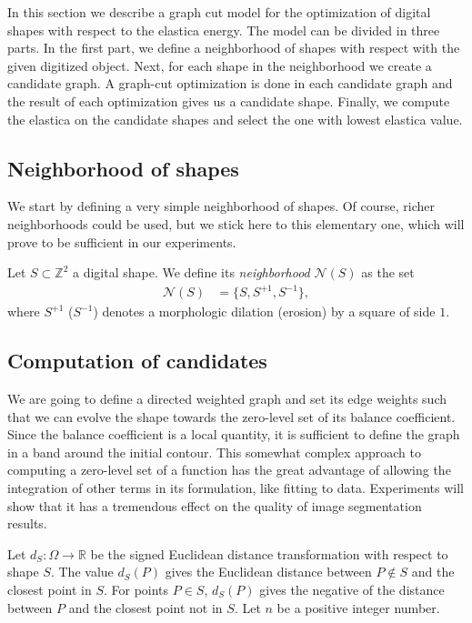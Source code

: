 \documentclass[review]{siamart220329}
\begin{document}
In this section we describe a graph cut model for the optimization of digital shapes with respect to the elastica energy. The model can be divided in three
parts. In the first part, we define a neighborhood of shapes with respect with the given digitized object. Next, for each shape in the neighborhood 
we create a candidate graph. A graph-cut optimization is done in each candidate graph and the result of each optimization gives us a candidate shape. Finally, we compute the elastica on the candidate shapes and select the one with lowest elastica value.
%
%
\subsection{Neighborhood of shapes}
%
%
We start by defining a very simple neighborhood of shapes. Of course, richer neighborhoods could be used, but we
stick here to this elementary one, which will prove to be sufficient in our experiments.
%
%
\begin{definition}
	Let $S \subset \mathbb{Z}^2$ a digital shape. We define its {\em neighborhood}  $\mathcal{N}(S)$ as the set
	\begin{align*}
		\mathcal{N}(S) &= \Big\{S, S^{+1},S^{-1} \big\},
	\end{align*}
	where $S^{+1}$ ($S^{-1}$) denotes a morphologic dilation (erosion) by a square of side $1$.
\end{definition}
%
%
\subsection{Computation of candidates}\label{sec:graph-cut-model}

We are going to define a directed weighted graph and set its edge weights
such that we can evolve the shape towards the zero-level set of
its balance coefficient. Since the balance
coefficient is a local quantity, it is sufficient to define the graph
in a band around the initial contour. This somewhat
  complex approach to computing a zero-level set of a function has the
  great advantage of allowing the integration of other terms in its
  formulation, like fitting to data. Experiments will show that it has
  a tremendous effect on the quality of image segmentation results.

Let $d_{S}:\Omega \rightarrow \mathbb{R}$ be the signed Euclidean distance transformation with respect to shape $S$. The value $d_{S}(P)$ gives the Euclidean distance between $P \notin S$ and the closest point in $S$. For points $P \in S$, $d_{S}(P)$ gives the negative of the distance between $P$ and the closest point not in $S$. Let $n$ be a positive integer number.
\end{document}
